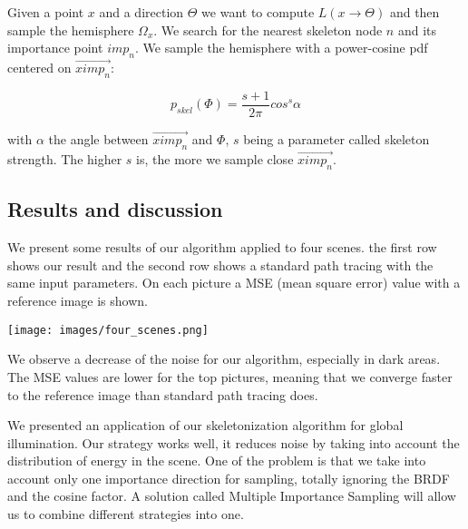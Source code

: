 Given a point $x$ and a direction $\Theta$ we want to compute $L(x \rightarrow \Theta)$ and then sample the hemisphere $\Omega_x$. We search for the nearest skeleton node $n$ and its importance point $imp_n$. We sample the hemisphere with a power-cosine pdf centered on $\overrightarrow{ximp_n}$:

\begin{equation*}
p_{skel}(\Phi) = \frac{s + 1}{2\pi} cos^s \alpha
\end{equation*}

with $\alpha$ the angle between $\overrightarrow{ximp_n}$ and $\Phi$, $s$ being a parameter called skeleton strength. The higher $s$ is, the more we sample close $\overrightarrow{ximp_n}$.

\clearpage
\subsection{Results and discussion}

We present some results of our algorithm applied to four scenes. the first row shows our result and the second row shows a standard path tracing with the same input parameters. On each picture a MSE (mean square error) value with a reference image is shown.

\begin{center}
\texttt{[image: images/four\_scenes.png]}
\end{center}

We observe a decrease of the noise for our algorithm, especially in dark areas. The MSE values are lower for the top pictures, meaning that we converge faster to the reference image than standard path tracing does.

We presented an application of our skeletonization algorithm for global illumination. Our strategy works well, it reduces noise by taking into account the distribution of energy in the scene. One of the problem is that we take into account only one importance direction for sampling, totally ignoring the BRDF and the cosine factor. A solution called Multiple Importance Sampling will allow us to combine different strategies into one.